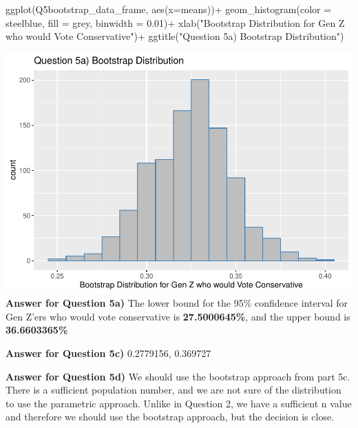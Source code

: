 \documentclass[
]{article}
\newenvironment{Shaded}{\begin{snugshade}}{\end{snugshade}}
\newcommand{\AttributeTok}[1]{\textcolor[rgb]{0.77,0.63,0.00}{#1}}
\newcommand{\FloatTok}[1]{\textcolor[rgb]{0.00,0.00,0.81}{#1}}
\newcommand{\FunctionTok}[1]{\textcolor[rgb]{0.00,0.00,0.00}{#1}}
\newcommand{\NormalTok}[1]{#1}
\newcommand{\SpecialCharTok}[1]{\textcolor[rgb]{0.00,0.00,0.00}{#1}}
\newcommand{\StringTok}[1]{\textcolor[rgb]{0.31,0.60,0.02}{#1}}
\begin{document}
\begin{Shaded}
\begin{Highlighting}[]
\FunctionTok{ggplot}\NormalTok{(Q5bootstrap\_data\_frame, }\FunctionTok{aes}\NormalTok{(}\AttributeTok{x=}\NormalTok{means))}\SpecialCharTok{+}
  \FunctionTok{geom\_histogram}\NormalTok{(}\AttributeTok{color =} \StringTok{\textquotesingle{}steelblue\textquotesingle{}}\NormalTok{, }\AttributeTok{fill =} \StringTok{\textquotesingle{}grey\textquotesingle{}}\NormalTok{, }\AttributeTok{binwidth =} \FloatTok{0.01}\NormalTok{)}\SpecialCharTok{+}
  \FunctionTok{xlab}\NormalTok{(}\StringTok{"Bootstrap Distribution for Gen Z who would Vote Conservative"}\NormalTok{)}\SpecialCharTok{+}
  \FunctionTok{ggtitle}\NormalTok{(}\StringTok{"Question 5a) Bootstrap Distribution"}\NormalTok{)}
\end{Highlighting}
\end{Shaded}

\includegraphics{Assignment2_files/figure-latex/Q5-1.pdf} \textbf{Answer
for Question 5a)} The lower bound for the 95\% confidence interval for
Gen Z'ers who would vote conservative is \textbf{27.5000645\%}, and the
upper bound is \textbf{36.6603365\%}

\textbf{Answer for Question 5c)} 0.2779156, 0.369727

\textbf{Answer for Question 5d)} We should use the bootstrap approach
from part 5c. There is a sufficient population number, and we are not
sure of the distribution to use the parametric approach. Unlike in
Question 2, we have a sufficient n value and therefore we should use the
bootstrap approach, but the decision is close.
\end{document}
